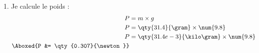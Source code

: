 \documentclass["../Cours.tex"]{subfiles}
\begin{document}
\begin{questions}
\begin{enumerate}
        \item Je calcule le poids : 
        \begin{align*}
            P &= m \times g \\ 
            P &= \qty{31.4}{\gram} \times \num{9.8} \\ 
            P &= \qty{31.4e-3}{\kilo\gram} \times \num{9.8} \\ 
            \Aboxed{P &= \qty{0.307}{\newton}}
        \end{align*}

    \end{enumerate}
\end{questions}
\end{document}
